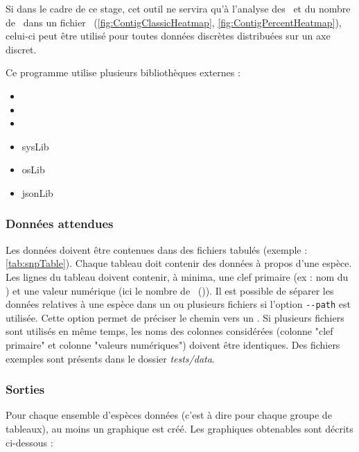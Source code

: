 \documentclass[../main]{subfiles} %
\begin{document}
Si dans le cadre de ce stage, cet outil ne servira qu'à l'analyse des \SNP et du nombre de \contigs dans un fichier \bam (\cref{fig:ContigClassicHeatmap}, \cref{fig:ContigPercentHeatmap}), celui-ci peut être utilisé pour toutes données discrètes distribuées sur un axe discret.

Ce programme utilise plusieurs bibliothèques externes : 
\begin{multicols}{3}
    \begin{itemize}
        \item \pytest
        \item \MatPlotLib
        \item \getopts
        \item \gls{sysLib}
        \item \gls{osLib}
        \item \gls{jsonLib}
    \end{itemize}
\end{multicols}

\subsubsection{Données attendues}
Les données doivent être contenues dans des fichiers tabulés (exemple : \cref{tab:snpTable}). Chaque tableau doit contenir des données à propos d’une espèce.  Les lignes du tableau doivent contenir, à minima, une clef primaire (ex : nom du \contig) et une valeur numérique (ici le nombre de \SNP (\NbSNP)). Il est possible de séparer les données relatives à une espèce dans un ou plusieurs fichiers si l’option \lstinline{--path} est utilisée. Cette option permet de préciser le chemin vers un \json. Si plusieurs fichiers sont utilisés en même temps, les noms des colonnes considérées (colonne "clef primaire" et colonne "valeurs numériques") doivent être identiques. Des fichiers exemples sont présents dans le dossier \textit{tests/data}.



\subsubsection{Sorties}
Pour chaque ensemble d’espèces données (c’est à dire pour chaque groupe de tableaux), au moins un graphique est créé. Les graphiques obtenables sont décrits ci-dessous :
\end{document}
